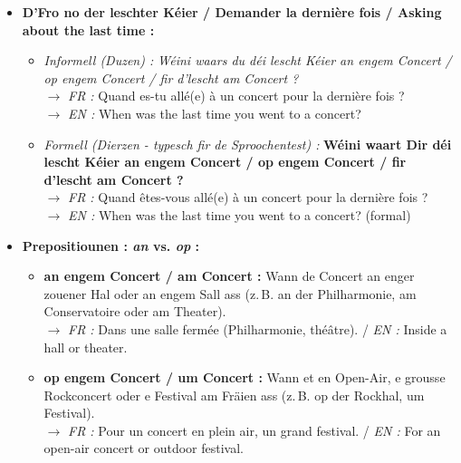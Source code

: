 \begin{itemize}
    \item \textbf{D'Fro no der leschter Kéier / Demander la dernière fois / Asking about the last time :}
    \begin{itemize}
        \item \textit{Informell (Duzen) :} \textit{Wéini waars du déi lescht Kéier an engem Concert / op engem Concert / fir d'lescht am Concert ?} \\
        $\rightarrow$ \textit{FR :} Quand es-tu allé(e) à un concert pour la dernière fois ? \\
        $\rightarrow$ \textit{EN :} When was the last time you went to a concert?
        \item \textit{Formell (Dierzen - typesch fir de Sproochentest) :} \textbf{Wéini waart Dir déi lescht Kéier an engem Concert / op engem Concert / fir d'lescht am Concert ?} \\
        $\rightarrow$ \textit{FR :} Quand êtes-vous allé(e) à un concert pour la dernière fois ? \\
        $\rightarrow$ \textit{EN :} When was the last time you went to a concert? (formal)
    \end{itemize}

    \vspace{0.4em}

    \item \textbf{Prepositiounen : \textit{an} vs. \textit{op} :}
    \begin{itemize}
        \item \textbf{an engem Concert / am Concert :} Wann de Concert an enger zouener Hal oder an engem Sall ass (z.\,B. an der Philharmonie, am Conservatoire oder am Theater). \\
        $\rightarrow$ \textit{FR :} Dans une salle fermée (Philharmonie, théâtre). / \textit{EN :} Inside a hall or theater.
        \item \textbf{op engem Concert / um Concert :} Wann et en Open-Air, e grousse Rockconcert oder e Festival am Fräien ass (z.\,B. op der Rockhal, um Festival). \\
        $\rightarrow$ \textit{FR :} Pour un concert en plein air, un grand festival. / \textit{EN :} For an open-air concert or outdoor festival.
    \end{itemize}

    \vspace{0.4em}


\end{itemize}

